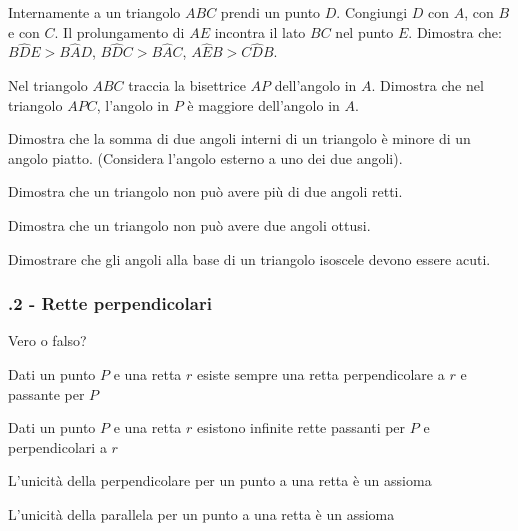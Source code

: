 \begin{esercizio}
\label{ese:3.4}
Internamente a un triangolo $ABC$ prendi un punto $D$. Congiungi $D$ con $A$, con $B$ e con $C$. Il prolungamento di $AE$ incontra il lato $BC$ nel punto $E$. Dimostra che: $B\widehat{D}E>B\widehat{A}D$, $B\widehat{D}C>B\widehat{A}C$, $A\widehat{E}B>C\widehat{D}B$.
\end{esercizio}

\begin{esercizio}
\label{ese:3.5}
Nel triangolo $ABC$ traccia la bisettrice $AP$ dell'angolo in $A$. Dimostra che nel triangolo $APC$, l'angolo in $P$ è maggiore dell'angolo in $A$.
\end{esercizio}

\begin{esercizio}
\label{ese:3.6}
Dimostra che la somma di due angoli interni di un triangolo è minore di un angolo piatto. (Considera l'angolo esterno a uno dei due angoli).
\end{esercizio}

\begin{esercizio}
\label{ese:3.7}
Dimostra che un triangolo non può avere più di due angoli retti.
\end{esercizio}

\begin{esercizio}
\label{ese:3.8}
Dimostra che un triangolo non può avere due angoli ottusi.
\end{esercizio}

\begin{esercizio}
\label{ese:3.9}
Dimostrare che gli angoli alla base di un triangolo isoscele devono essere acuti.
\end{esercizio}

\subsubsection*{\thechapter.2 - Rette perpendicolari}

\begin{esercizio}
\label{ese:3.10}
Vero o falso?
\begin{enumeratea}
\item Dati un punto $P$ e una retta $r$ esiste sempre una retta perpendicolare a $r$ e passante per $P$\tab\hfill\boxV\quad\boxF
\item Dati un punto $P$ e una retta $r$ esistono infinite rette passanti per $P$ e perpendicolari a $r$\tab\hfill\boxV\quad\boxF
\item L'unicità della perpendicolare per un punto a una retta è un assioma\hfill\boxV\quad\boxF
\item L'unicità della parallela per un punto a una retta è un assioma\hfill\boxV\quad\boxF
\end{enumeratea}
\end{esercizio}

